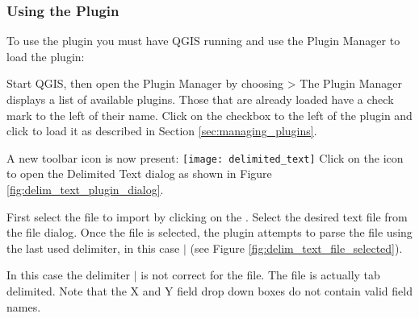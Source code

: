 \subsubsection{Using the Plugin}
To use the plugin you must have QGIS running and use the Plugin Manager to load the plugin:

Start QGIS, then open the Plugin Manager by choosing  > 
The Plugin Manager displays a list of available plugins.
Those that are already loaded have a check mark to the left of their name.
Click on the checkbox to the left of the  plugin and click  to load it as described in Section \ref{sec:managing_plugins}.


A new toolbar icon is now present:
\texttt{[image: delimited\_text]}
Click on the icon  to open the Delimited Text dialog as shown in Figure
\ref{fig:delim_text_plugin_dialog}.


First select the file to import by clicking on the \browsebutton .
Select the desired text file from the file dialog.
Once the file is selected, the plugin attempts to parse the file using the last used delimiter, in this case \mbox{$|$} (see Figure \ref{fig:delim_text_file_selected}).

  
In this case the delimiter \mbox{$|$} is not correct for the file.
The file is actually tab delimited.
Note that the X and Y field drop down boxes do not contain valid field names.


